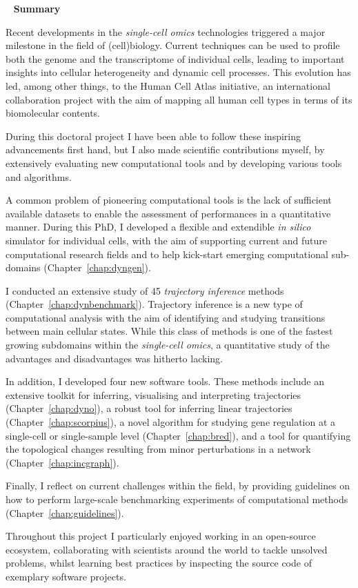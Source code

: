 \newpage
\ 
\vfill
{\bfseries\LARGE Summary}
\vfill
{
\fontsize{9}{10}\selectfont
Recent developments in the \textit{single-cell omics} technologies triggered a major milestone in the field of (cell)biology. Current techniques can be used to profile both the genome and the transcriptome of individual cells, leading to important insights into cellular heterogeneity and dynamic cell processes. This evolution has led, among other things, to the Human Cell Atlas initiative, an international collaboration project with the aim of mapping all human cell types in terms of its biomolecular contents.

During this doctoral project I have been able to follow these inspiring advancements first hand, but I also made scientific contributions myself, by extensively evaluating new computational tools and by developing various tools and algorithms.

A common problem of pioneering computational tools is the lack of sufficient available datasets to enable the assessment of performances in a quantitative manner. During this PhD, I developed a flexible and extendible \textit{in silico} simulator for individual cells, with the aim of supporting current and future computational research fields and to help kick-start emerging computational sub-domains (Chapter~\ref{chap:dyngen}).

I conducted an extensive study of 45 \textit{trajectory inference} methods (Chapter~\ref{chap:dynbenchmark}). Trajectory inference is a new type of computational analysis with the aim of identifying and studying transitions between main cellular states. While this class of methods is one of the fastest growing subdomains within the \textit{single-cell omics}, a quantitative study of the advantages and disadvantages was hitherto lacking.

In addition, I developed four new software tools. These methods include an extensive toolkit for inferring, visualising and interpreting trajectories (Chapter~\ref{chap:dyno}), a robust tool for inferring linear trajectories (Chapter~\ref{chap:scorpius}), a novel algorithm for studying gene regulation at a single-cell or single-sample level (Chapter~\ref{chap:bred}), and a tool for quantifying the topological changes resulting from minor perturbations in a network (Chapter~\ref{chap:incgraph}).

Finally, I reflect on current challenges within the field, by providing guidelines on how to perform large-scale benchmarking experiments of computational methods (Chapter~\ref{chap:guidelines}).

Throughout this project I particularly enjoyed working in an open-source ecosystem, collaborating with scientists around the world to tackle unsolved problems, whilst learning best practices by inspecting the source code of exemplary software projects. 
\vfill
}

